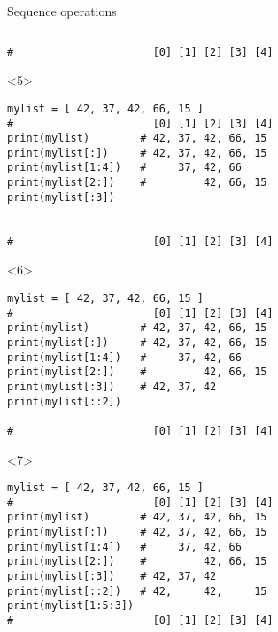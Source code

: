 \begin{frame}[fragile]{Sequence operations}
\begin{center}
\begin{columns}[onlytextwidth]
\begin{column}{\textwidth}
\begin{onlyenv}
\begin{lstlisting}[style=python,morekeywords={for, in, range, list}]
#                      [0] [1] [2] [3] [4] \end{lstlisting}
      \end{onlyenv}

      \begin{onlyenv}<5>
        \begin{lstlisting}[style=python,morekeywords={for, in, range, list}]
mylist = [ 42, 37, 42, 66, 15 ]
#                      [0] [1] [2] [3] [4]
print(mylist)        # 42, 37, 42, 66, 15
print(mylist[:])     # 42, 37, 42, 66, 15
print(mylist[1:4])   #     37, 42, 66
print(mylist[2:])    #         42, 66, 15
print(mylist[:3])


#                      [0] [1] [2] [3] [4] \end{lstlisting}
      \end{onlyenv}

      \begin{onlyenv}<6>
        \begin{lstlisting}[style=python,morekeywords={for, in, range, list}]
mylist = [ 42, 37, 42, 66, 15 ]
#                      [0] [1] [2] [3] [4]
print(mylist)        # 42, 37, 42, 66, 15
print(mylist[:])     # 42, 37, 42, 66, 15
print(mylist[1:4])   #     37, 42, 66
print(mylist[2:])    #         42, 66, 15
print(mylist[:3])    # 42, 37, 42
print(mylist[::2])

#                      [0] [1] [2] [3] [4] \end{lstlisting}
      \end{onlyenv}

      \begin{onlyenv}<7>
        \begin{lstlisting}[style=python,morekeywords={for, in, range, list}]
mylist = [ 42, 37, 42, 66, 15 ]
#                      [0] [1] [2] [3] [4]
print(mylist)        # 42, 37, 42, 66, 15
print(mylist[:])     # 42, 37, 42, 66, 15
print(mylist[1:4])   #     37, 42, 66
print(mylist[2:])    #         42, 66, 15
print(mylist[:3])    # 42, 37, 42
print(mylist[::2])   # 42,     42,     15
print(mylist[1:5:3])
#                      [0] [1] [2] [3] [4] \end{lstlisting}
      \end{onlyenv}


\end{column}
\end{columns}
\end{center}
\end{frame}
